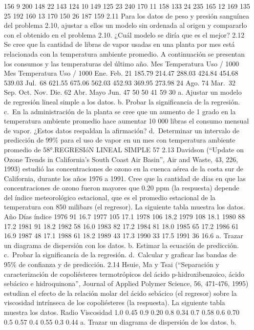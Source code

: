 \documentclass[
]{article}
\begin{document}
156 9 200 148 22 143 124 10 149 125 23 240 170 11 158 133 24 235 165 12
169 135 25 192 160 13 170 150 26 187 159 2.11 Para los datos de peso y
presión sanguínea del problema 2.10, ajustar a ellos un modelo sin
ordenada al origen y compararlo con el obtenido en el problema 2.10.
¿Cuál modelo se diría que es el mejor? 2.12 Se cree que la cantidad de
libras de vapor usadas en una planta por mes está relacionada con la
temperatura ambiente promedio. A continuación se presentan los consumos
y las temperaturas del último año. Mes Temperatura Uso / 1000 Mes
Temperatura Uso / 1000 Ene. Feb. 21 185.79 214.47 288.03 424.84 454.68
539.03 Jul.~68 621.55 675.06 562.03 452.93 369.95 273.98 24 Ago. 74
Mar.~32 Sep. Oct. Nov. Die. 62 Abr. Mayo Jun. 47 50 50 41 59 30 a.
Ajustar un modelo de regresión lineal simple a los datos. b. Probar la
significancia de la regresión. c.~En la administración de la planta se
cree que un aumento de 1 grado en la temperatura ambiente promedio hace
aumentar 10 000 libras el consumo mensual de vapor. ¿Estos datos
respaldan la afirmación? d.~Determinar un intervalo de predicción de
99\% para el uso de vapor en un mes con temperatura ambiente promedio de
58°.REGRESIóN LINEAL SIMPLE 57 2.13 Davidson (``Update on Ozone Trends
in California's South Coast Air Basin'', Air and Waste, 43, 226, 1993)
estudió las concentraciones de ozono en la cuenca aérea de la costa sur
de California, durante los años 1976 a 1991. Cree que la cantidad de
días en que las concentraciones de ozono fueron mayores que 0.20 ppm (la
respuesta) depende del índice meteorológico estacional, que es el
promedio estacional de la temperatura con 850 milibars (el regresor). La
siguiente tabla muestra los datos. Año Días índice 1976 91 16.7 1977 105
17.1 1978 106 18.2 1979 108 18.1 1980 88 17.2 1981 91 18.2 1982 58 16.0
1983 82 17.2 1984 81 18.0 1985 65 17.2 1986 61 16.9 1987 48 17.1 1988 61
18.2 1989 43 17.3 1990 33 17.5 1991 36 16.6 a. Trazar un diagrama de
dispersión con los datos. b. Estimar la ecuación de predicción.
c.~Probar la significancia de la regresión. d.~Calcular y graficar las
bandas de 95\% de confianza y de predicción. 2.14 Hsuie, Ma y Tsai
(``Separación y caracterización de copoliésteres termotrópicos del ácido
p-hidroxibenzoico, ácido sebácico e hidroquinona'', Journal of Applied
Polymer Science, 56, 471-476, 1995) estudian el efecto de la relación
molar del ácido sebácico (el regresor) sobre la viscosidad intrínseca de
los copoliésteres (la respuesta). La siguiente tabla muestra los datos.
Radio Viscosidad 1.0 0.45 0.9 0.20 0.8 0.34 0.7 0.58 0.6 0.70 0.5 0.57
0.4 0.55 0.3 0.44 a. Trazar un diagrama de dispersión de los datos. b.
\end{document}
